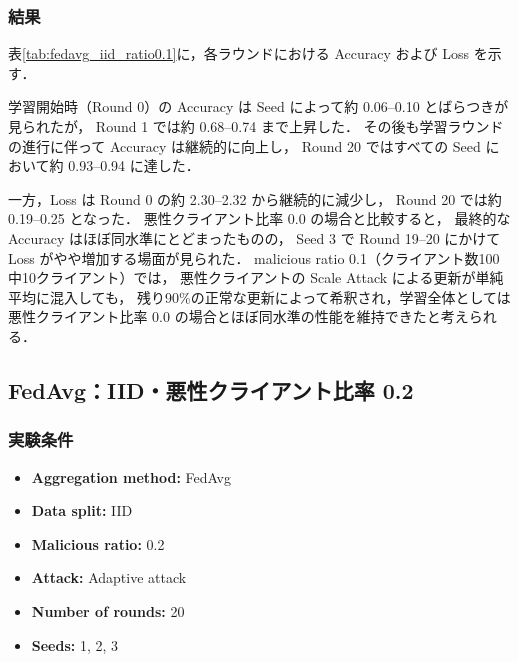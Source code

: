 \documentclass[a4j,twocolumn,dvipdfmx]{jsarticle}
\begin{document}
\subsubsection{結果}

表\ref{tab:fedavg_iid_ratio0.1}に，各ラウンドにおける
Accuracy および Loss を示す．

学習開始時（Round 0）の Accuracy は Seed によって約 0.06--0.10 とばらつきが見られたが，
Round 1 では約 0.68--0.74 まで上昇した．
その後も学習ラウンドの進行に伴って Accuracy は継続的に向上し，
Round 20 ではすべての Seed において約 0.93--0.94 に達した．

一方，Loss は Round 0 の約 2.30--2.32 から継続的に減少し，
Round 20 では約 0.19--0.25 となった．
悪性クライアント比率 0.0 の場合と比較すると，
最終的な Accuracy はほぼ同水準にとどまったものの，
Seed 3 で Round 19--20 にかけて Loss がやや増加する場面が見られた．
malicious ratio 0.1（クライアント数100中10クライアント）では，
悪性クライアントの Scale Attack による更新が単純平均に混入しても，
残り90\%の正常な更新によって希釈され，学習全体としては
悪性クライアント比率 0.0 の場合とほぼ同水準の性能を維持できたと考えられる．

\clearpage
\subsection{FedAvg：IID・悪性クライアント比率 0.2}

\subsubsection{実験条件}

\begin{itemize}
    \item \textbf{Aggregation method:} FedAvg
    \item \textbf{Data split:} IID
    \item \textbf{Malicious ratio:} 0.2
    \item \textbf{Attack:} Adaptive attack
    \item \textbf{Number of rounds:} 20
    \item \textbf{Seeds:} 1, 2, 3
\end{itemize}

\end{document}
